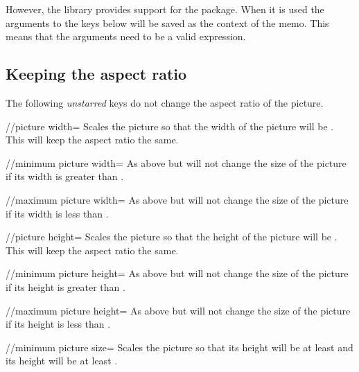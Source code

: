 \begin{multicols}{2}
However, the library provides support for the
 \cite{memoize} package.
When it is used the arguments to the keys below
will be saved as the context of the memo.
This means that the arguments need to be a valid
 expression.

\subsection{Keeping the aspect ratio}
The following \emph{unstarred} keys do not change the aspect ratio of the picture.

\begin{key}{/\tikzext/picture width=}
  Scales the picture so that the width of the picture will be .
  This will keep the aspect ratio the same.
\end{key}

\begin{key}{/\tikzext/minimum picture width=}
  As above but will not change the size of the picture
  if its width is greater than .
\end{key}

\begin{key}{/\tikzext/maximum picture width=}
  As above but will not change the size of the picture
  if its width is less than .
\end{key}

\begin{key}{/\tikzext/picture height=}
  Scales the picture so that the height of the picture will be .
  This will keep the aspect ratio the same.
\end{key}

\begin{key}{/\tikzext/minimum picture height=}
  As above but will not change the size of the picture
  if its height is greater than .
\end{key}

\begin{key}{/\tikzext/maximum picture height=}
  As above but will not change the size of the picture
  if its height is less than .
\end{key}

\begin{key}{/\tikzext/minimum picture size=}
  Scales the picture so that its height will be at least 
  and its height will be at least .
\end{key}


\end{multicols}
